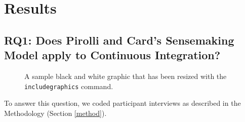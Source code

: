\documentclass{sig-alternate}
\begin{document}
\section{Results}

\subsection{RQ1:  Does Pirolli and Card's Sensemaking Model apply to Continuous Integration?}
\begin{figure}
\centering
{}
\caption{A sample black and white graphic
that has been resized with the \texttt{includegraphics} command.}
\end{figure}

To answer this question, we coded participant interviews as described in the Methodology (Section \ref{method}).
\end{document}
